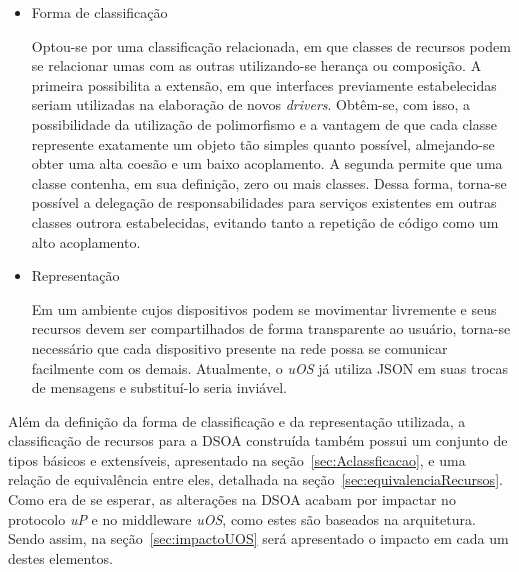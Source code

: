 \begin{itemize}
	\item Forma de classificação

	Optou-se por uma classificação relacionada, em que classes de recursos podem se relacionar umas com as outras utilizando-se herança ou composição. A primeira possibilita a extensão, em que interfaces previamente estabelecidas seriam utilizadas na elaboração de novos \emph{drivers}. Obtêm-se, com isso, a possibilidade da utilização de polimorfismo e a vantagem de que cada classe represente exatamente um objeto tão simples quanto possível, almejando-se obter uma alta coesão e um baixo acoplamento. A segunda permite que uma classe contenha, em sua definição, zero ou mais classes. Dessa forma, torna-se possível a delegação de responsabilidades para serviços existentes em outras classes outrora estabelecidas, evitando tanto a repetição de código como um alto acoplamento.

	\item Representação

	Em um ambiente cujos dispositivos podem se movimentar livremente e seus recursos devem ser compartilhados de forma transparente ao usuário, torna-se necessário que cada dispositivo presente na rede possa se comunicar facilmente com os demais. Atualmente, o \emph{uOS} já utiliza JSON em suas trocas de mensagens e substituí-lo seria inviável.

	\begin{comment}
	Tal formato apresenta as seguintes características:
	
		\begin{itemize}
	 		\item Baixo custo computacional~\cite{comparativojson};
	 		\item É auto-descritivo, o que facilita os processos de leitura e escrita por seres-humanos~\cite{json};
	 		\item É estruturado, o que facilita sua criação e análise por computadores~\cite{json};
	 		\item É independente de plataforma, pois utiliza UTF-8 como codificação~\cite{utf8}.
	 	\end{itemize}
	 \end{comment}
\end{itemize}

Além da definição da forma de classificação e da representação utilizada, a classificação de recursos para a DSOA construída também possui um conjunto de tipos básicos e extensíveis, apresentado na seção~\ref{sec:Aclassficacao}, e uma relação de equivalência entre eles, detalhada na seção~\ref{sec:equivalenciaRecursos}. Como era de se esperar, as alterações na DSOA acabam por impactar no protocolo \emph{uP} e no middleware \emph{uOS}, como estes são baseados na arquitetura. Sendo assim, na seção~\ref{sec:impactoUOS} será apresentado o impacto em cada um destes elementos.

